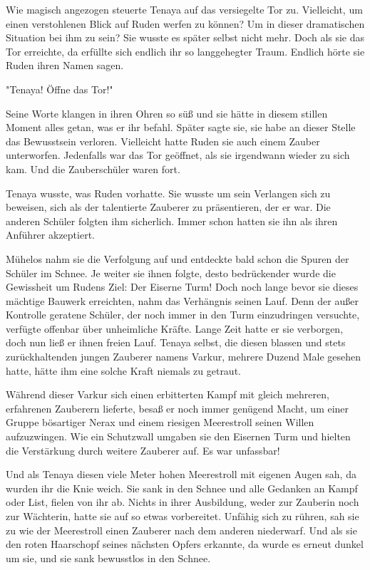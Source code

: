 \documentclass[10pt, a4paper, oneside]{book}
\begin{document}
\begin{multicols}{2}
Wie magisch angezogen steuerte Tenaya auf das versiegelte Tor zu. Vielleicht, um einen verstohlenen Blick auf Ruden werfen zu können? Um in dieser dramatischen Situation bei ihm zu sein? Sie wusste es später selbst nicht mehr. Doch als sie das Tor erreichte, da erfüllte sich endlich ihr so langgehegter Traum. Endlich hörte sie Ruden ihren Namen sagen.

"Tenaya! Öffne das Tor!"

Seine Worte klangen in ihren Ohren so süß und sie hätte in diesem stillen Moment alles getan, was er ihr befahl. Später sagte sie, sie habe an dieser Stelle das Bewusstsein verloren. Vielleicht hatte Ruden sie auch einem Zauber unterworfen. Jedenfalls war das Tor geöffnet, als sie irgendwann wieder zu sich kam. Und die Zauberschüler waren fort.

Tenaya wusste, was Ruden vorhatte. Sie wusste um sein Verlangen sich zu beweisen, sich als der talentierte Zauberer zu präsentieren, der er war. Die anderen Schüler folgten ihm sicherlich. Immer schon hatten sie ihn als ihren Anführer akzeptiert.

Mühelos nahm sie die Verfolgung auf und entdeckte bald schon die Spuren der Schüler im Schnee. Je weiter sie ihnen folgte, desto bedrückender wurde die Gewissheit um Rudens Ziel: Der Eiserne Turm! Doch noch lange bevor sie dieses mächtige Bauwerk erreichten, nahm das Verhängnis seinen Lauf. Denn der außer Kontrolle geratene Schüler, der noch immer in den Turm einzudringen versuchte, verfügte offenbar über unheimliche Kräfte. Lange Zeit hatte er sie verborgen, doch nun ließ er ihnen freien Lauf. Tenaya selbst, die diesen blassen und stets zurückhaltenden jungen Zauberer namens Varkur, mehrere Duzend Male gesehen hatte, hätte ihm eine solche Kraft niemals zu getraut.

Während dieser Varkur sich einen erbitterten Kampf mit gleich mehreren, erfahrenen Zauberern lieferte, besaß er noch immer genügend Macht, um einer Gruppe bösartiger Nerax und einem riesigen Meerestroll seinen Willen aufzuzwingen. Wie ein Schutzwall umgaben sie den Eisernen Turm und hielten die Verstärkung durch weitere Zauberer auf. Es war unfassbar!

Und als Tenaya diesen viele Meter hohen Meerestroll mit eigenen Augen sah, da wurden ihr die Knie weich. Sie sank in den Schnee und alle Gedanken an Kampf oder List, fielen von ihr ab. Nichts in ihrer Ausbildung, weder zur Zauberin noch zur Wächterin, hatte sie auf so etwas vorbereitet. Unfähig sich zu rühren, sah sie zu wie der Meerestroll einen Zauberer nach dem anderen niederwarf. Und als sie den roten Haarschopf seines nächsten Opfers erkannte, da wurde es erneut dunkel um sie, und sie sank bewusstlos in den Schnee.







\end{multicols}
\end{document}
